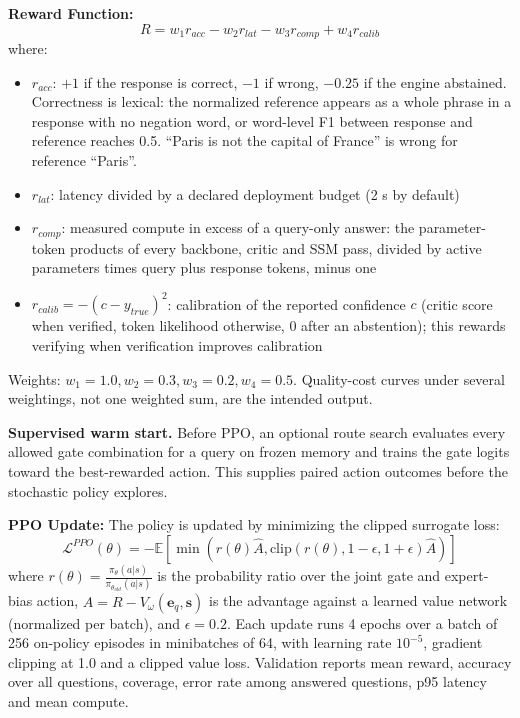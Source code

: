 \documentclass{article}
\begin{document}
\textbf{Reward Function:}
\begin{equation}
R = w_1 r_{acc} - w_2 r_{lat} - w_3 r_{comp} + w_4 r_{calib}
\end{equation}
where:
\begin{itemize}
    \item $r_{acc}$: $+1$ if the response is correct, $-1$ if wrong, $-0.25$ if the engine abstained. Correctness is lexical: the normalized reference appears as a whole phrase in a response with no negation word, or word-level F1 between response and reference reaches 0.5. ``Paris is not the capital of France'' is wrong for reference ``Paris''.
    \item $r_{lat}$: latency divided by a declared deployment budget (2 s by default)
    \item $r_{comp}$: measured compute in excess of a query-only answer: the parameter-token products of every backbone, critic and SSM pass, divided by active parameters times query plus response tokens, minus one
    \item $r_{calib} = -(c - y_{true})^2$: calibration of the reported confidence $c$ (critic score when verified, token likelihood otherwise, 0 after an abstention); this rewards verifying when verification improves calibration
\end{itemize}

Weights: $w_1=1.0, w_2=0.3, w_3=0.2, w_4=0.5$. Quality-cost curves under several weightings, not one weighted sum, are the intended output.

\textbf{Supervised warm start.} Before PPO, an optional route search evaluates every allowed gate combination for a query on frozen memory and trains the gate logits toward the best-rewarded action. This supplies paired action outcomes before the stochastic policy explores.

\textbf{PPO Update:}
The policy is updated by minimizing the clipped surrogate loss:
\begin{equation}
\mathcal{L}^{PPO}(\theta) = -\mathbb{E} \left[ \min \left( r(\theta) \hat{A}, \text{clip}(r(\theta), 1-\epsilon, 1+\epsilon) \hat{A} \right) \right]
\end{equation}
where $r(\theta) = \frac{\pi_\theta(a|s)}{\pi_{\theta_{old}}(a|s)}$ is the probability ratio over the joint gate and expert-bias action, $\hat{A} = R - V_\omega(\mathbf{e}_q, \mathbf{s})$ is the advantage against a learned value network (normalized per batch), and $\epsilon=0.2$. Each update runs 4 epochs over a batch of 256 on-policy episodes in minibatches of 64, with learning rate $10^{-5}$, gradient clipping at 1.0 and a clipped value loss. Validation reports mean reward, accuracy over all questions, coverage, error rate among answered questions, p95 latency and mean compute.
\end{document}
